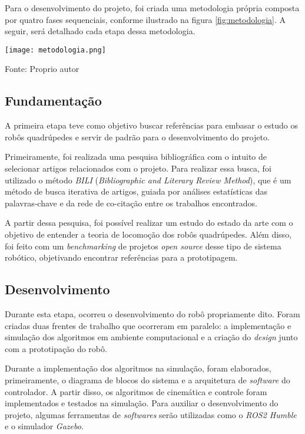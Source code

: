 \documentclass[../main.tex]{subfiles}
\begin{document}
  Para o desenvolvimento do projeto, foi criada uma metodologia própria composta por quatro fases sequenciais, conforme ilustrado na figura \ref{fig:metodologia}. A seguir, será detalhado cada etapa dessa metodologia.

  \begin{figure*}[h]
    \centering
    \caption{Metodologia}
    \texttt{[image: metodologia.png]}

    Fonte: Proprio autor
    \label{fig:metodologia}
  \end{figure*}

  \subsection{Fundamentação}
  A primeira etapa teve como objetivo buscar referências para embasar o estudo os robôs quadrúpedes e servir de padrão para o desenvolvimento do projeto.

  Primeiramente, foi realizada uma pesquisa bibliográfica com o intuito de selecionar artigos relacionados com o projeto. Para realizar essa busca, foi utilizado o método \textit{BILI} (\textit{Bibliographic and Literary Review Method}), que é um método de busca iterativa de artigos, guiada por análises estatísticas das palavras-chave e da rede de co-citação entre os trabalhos encontrados.

  A partir dessa pesquisa, foi possível realizar um estudo do estado da arte com o objetivo de entender a teoria de locomoção dos robôs quadrúpedes. Além disso, foi feito com um \textit{benchmarking} de projetos \textit{open source} desse tipo de sistema robótico, objetivando encontrar referências para a prototipagem.

  \subsection{Desenvolvimento}
  Durante esta etapa, ocorreu o desenvolvimento do robô propriamente dito. Foram criadas duas frentes de trabalho que ocorreram em paralelo: a implementação e simulação dos algoritmos em ambiente computacional e a criação do \textit{design} junto com a prototipação do robô.

  Durante a implementação dos algoritmos na simulação, foram elaborados, primeiramente, o diagrama de blocos do sistema e a arquitetura de \textit{software} do controlador. A partir disso, os algoritmos de cinemática e controle foram implementados e testados na simulação. Para auxiliar o desenvolvimento do projeto, algumas ferramentas de \textit{softwares} serão utilizadas como o \textit{ROS2 Humble} e o simulador \textit{Gazebo}.
\end{document}
